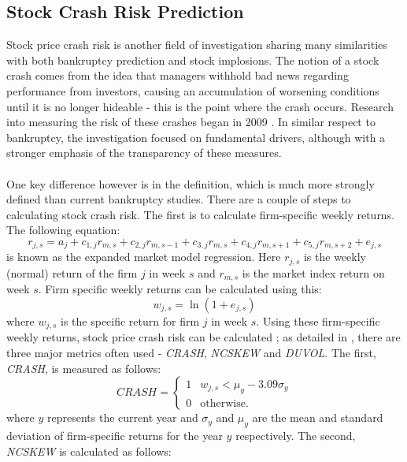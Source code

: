 \documentclass[a4paper]{report}
\begin{document}
\subsection{Stock Crash Risk Prediction}
Stock price crash risk is another field of investigation sharing many similarities with both bankruptcy prediction and stock implosions. The notion of a stock crash comes from the idea that managers withhold
bad news regarding performance from investors, causing an accumulation of worsening conditions until it is no longer hideable - this is the point where the crash occurs. Research into measuring the risk 
of these crashes began in 2009 \citep{hutton2009opaque}. In similar respect to bankruptcy, the investigation focused on fundamental drivers, although with a stronger emphasis of the transparency of these measures.\\\\One 
key difference however is in the definition, which is much more strongly defined than current bankruptcy studies. There are a couple of steps to calculating stock crash risk. The first is to calculate
firm-specific weekly returns. The following equation:
\begin{equation}
  r_{j,s} = a_{j} + c_{1,j} r_{m,s} + c_{2,j} r_{m,s-1} + c_{3,j} r_{m,s} + c_{4,j} r_{m,s+1} + c_{5,j} r_{m,s+2} + e_{j,s}
\end{equation}
is known as the expanded market model regression. Here \(r_{j,s}\) is the weekly (normal) return of the firm \(j\) in week \(s\) and \(r_{m,s}\) is the market index return on week \(s\). Firm specific weekly returns can be calculated using this:
\begin{equation}
  w_{j,s} = \ln(1 + e_{j,s})
\end{equation} 
where \(w_{j,s}\) is the specific return for firm \(j\) in week \(s\). Using these firm-specific weekly returns, stock price crash risk can be calculated ; as detailed in \citep{habib2018stock}, there are three major metrics often used - \textit{CRASH}, \textit{NCSKEW} and \textit{DUVOL}. The first, \textit{CRASH}, is measured as follows:
\[
\textit{{CRASH}} = \begin{cases}
    1 & w_{j,s} < \mu_{y} - 3.09 \sigma_{y} \\
    0 & \text{otherwise.}
\end{cases}
\]
where \(y\) represents the current year and \(\sigma_{y}\) and \(\mu_{y}\) are the mean and standard deviation of firm-specific returns for the year \(y\) respectively. The second, \textit{NCSKEW} is calculated as follows:
\end{document}
